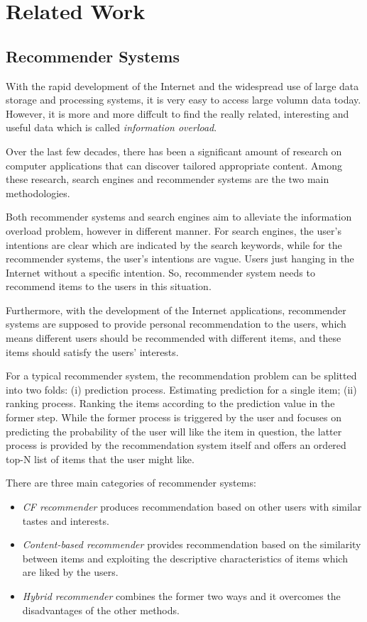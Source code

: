 \chapter{Related Work}\label{sec:rel}

\section{Recommender Systems}
With the rapid development of the Internet and the widespread use of large data
storage and processing systems, it is very easy to access large volumn data today.
However, it is more and more diffcult to find the really related, interesting and 
useful data which is called \textit{information overload}.

Over the last few decades, there has been a significant amount of research on 
computer applications that can discover tailored appropriate content. Among these
research, search engines and recommender systems are the two main methodologies.

Both recommender systems and search engines aim to alleviate the information overload
problem, however in different manner. For search engines, the user's intentions are
clear which are indicated by the search keywords, while for the recommender systems,
the user's intentions are vague. Users just hanging in the Internet without a specific
intention. So, recommender system needs to recommend items to the users in this situation.

Furthermore, with the development of the Internet applications, recommender systems are
supposed to provide personal recommendation to the users, which means different
users should be recommended with different items, and these items should satisfy the
users' interests.

For a typical recommender system, the recommendation problem can be splitted into 
two folds: (i) prediction process. Estimating prediction for a single item; 
(ii) ranking process. Ranking the items according to the prediction value in 
the former step. While the former process is triggered by the user and 
focuses on predicting the probability of the user will like the item in 
question, the latter process is provided by the recommendation system itself 
and offers an ordered top-N list of items that the user might like.

There are three main categories of recommender systems:
\begin{itemize}
    \item \textit{CF recommender} produces recommendation based on other users
        with similar tastes and interests. 
    \item \textit{Content-based recommender} provides recommendation based on 
        the similarity between items and exploiting the descriptive characteristics of
        items which are liked by the users.
    \item \textit{Hybrid recommender} combines the former two ways and it overcomes
        the disadvantages of the other methods.
\end{itemize}

